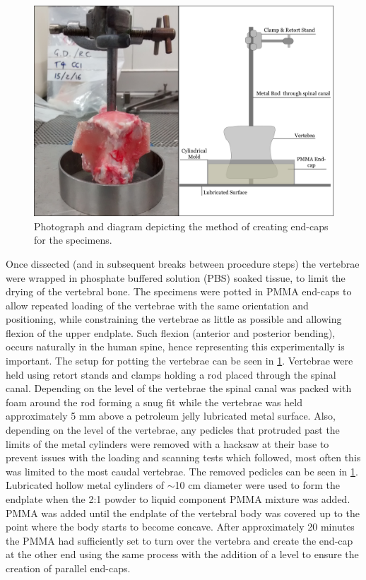 \begin{figure}[ht!] \centering
\includegraphics[width=5in]{images/potting_vertebra.png} \caption{Photograph
and diagram depicting the method of creating end-caps for the specimens.}
\label{fig:potting_vertebra} \end{figure}



Once dissected (and in subsequent breaks between procedure steps) the vertebrae
were wrapped in phosphate buffered solution (PBS) soaked tissue, to limit the
drying of the vertebral bone. The specimens were potted in PMMA end-caps to
allow repeated loading of the vertebrae with the same orientation and
positioning, while constraining the vertebrae as little as possible and
allowing flexion of the upper endplate.  Such flexion (anterior and posterior
bending), occurs naturally in the human spine, hence representing this
experimentally is important.  The setup for potting the vertebrae can be seen
in \cref{fig:potting_vertebra}.  Vertebrae were held using retort stands and
clamps holding a rod placed through the spinal canal. Depending on the level of
the vertebrae the spinal canal was packed with foam around the rod forming a
snug fit while the vertebrae was held approximately 5 mm above a petroleum
jelly lubricated metal surface. Also, depending on the level of the vertebrae,
any pedicles that protruded past the limits of the metal cylinders were removed
with a hacksaw at their base to prevent issues with the loading and scanning
tests which followed, most often this was limited to the most caudal vertebrae.
The removed pedicles can be seen in \cref{fig:potting_vertebra}. Lubricated
hollow metal cylinders of \(\sim\)10 cm diameter were used to form the endplate
when the 2:1 powder to liquid component PMMA mixture was added. PMMA was added
until the endplate of the vertebral body was covered up to the point where the
body starts to become concave. After approximately 20 minutes the PMMA had
sufficiently set to turn over the vertebra and create the end-cap at the other
end using the same process with the addition of a level to ensure the creation
of parallel end-caps.

